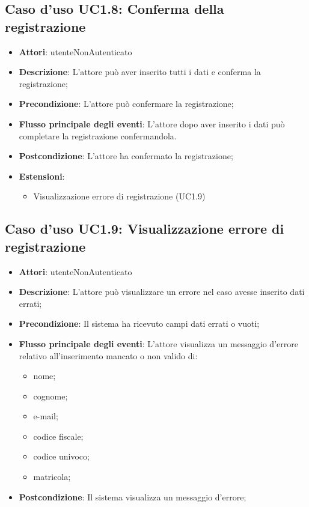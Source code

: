 \subsection{Caso d'uso \texorpdfstring{UC1.8}{UC1.8}: Conferma della registrazione}
\begin{itemize}
\item \textbf{Attori}: utenteNonAutenticato
\item \textbf{Descrizione}: L'attore può aver inserito tutti i dati  e conferma la registrazione;
\item \textbf{Precondizione}: L'attore può confermare la registrazione;
\item \textbf{Flusso principale degli eventi}: L'attore dopo aver inserito i dati può completare la registrazione confermandola.
\item \textbf{Postcondizione}: L'attore ha confermato la registrazione;
\item \textbf{Estensioni}:
\begin{itemize}
\item Visualizzazione errore di registrazione (UC1.9)
\end{itemize}
\end{itemize}
\subsection{Caso d'uso \texorpdfstring{UC1.9}{UC1.9}: Visualizzazione errore di registrazione}
\begin{itemize}
\item \textbf{Attori}: utenteNonAutenticato
\item \textbf{Descrizione}: L'attore può visualizzare un errore nel caso avesse inserito dati errati;
\item \textbf{Precondizione}: Il sistema ha ricevuto campi dati errati o vuoti;
\item \textbf{Flusso principale degli eventi}: L'attore visualizza un messaggio d'errore relativo all'inserimento mancato o non valido di:
\begin{itemize}
\item nome;
\item cognome;
\item e-mail;
\item codice fiscale;
\item codice univoco;
\item matricola;
\end{itemize}
\item \textbf{Postcondizione}: Il sistema visualizza un messaggio d'errore;
\end{itemize}
